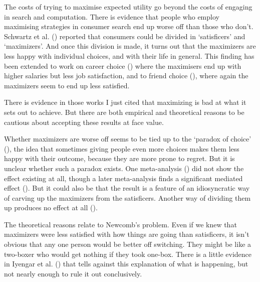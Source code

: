 \documentclass[
  10pt,
  letterpaper,
  twoside]{scrbook}
\begin{document}
The costs of trying to maximise expected utility go beyond the costs of
engaging in search and computation. There is evidence that people who
employ maximising strategies in consumer search end up worse off than
those who don't. Schwartz et al. ()
reported that consumers could be divided in `satisficers' and
`maximizers'. And once this division is made, it turns out that the
maximizers are less happy with individual choices, and with their life
in general. This finding has been extended to work on career choice
()
where the maximisers end up with higher salaries but less job
satisfaction, and to friend choice
(), where again the maximizers seem to end up less satisfied.

There is evidence in those works I just cited that maximizing is bad at
what it sets out to achieve. But there are both empirical and
theoretical reasons to be cautious about accepting these results at face
value.

Whether maximizers are worse off seems to be tied up to the `paradox of
choice' (), the idea that
sometimes giving people even more choices makes them less happy with
their outcome, because they are more prone to regret. But it is unclear
whether such a paradox exists. One meta-analysis
() did not show the effect existing at all, though a later
meta-analysis finds a significant mediated effect
().
But it could also be that the result is a feature of an idiosyncratic
way of carving up the maximizers from the satisficers. Another way of
dividing them up produces no effect at all
().

The theoretical reasons relate to Newcomb's problem. Even if we knew
that maximizers were less satisfied with how things are going than
satisficers, it isn't obvious that any one person would be better off
switching. They might be like a two-boxer who would get nothing if they
took one-box. There is a little evidence in Iyengar et al.
() that tells against this
explanation of what is happening, but not nearly enough to rule it out
conclusively.
\end{document}
